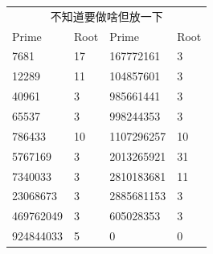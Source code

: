
\begin{tabular}{ l l l l }
    \multicolumn{4}{c}{不知道要做啥但放一下}\\
    Prime & Root & Prime & Root \\
    7681  &   17 & 167772161 & 3 \\
    12289 & 11  &104857601 & 3 \\
    40961 & 3 & 985661441 & 3 \\
    65537 & 3 & 998244353 & 3 \\   
    786433 & 10 & 1107296257 & 10 \\
    5767169 & 3 & 2013265921 & 31 \\
    7340033 & 3 & 2810183681 & 11 \\
    23068673 & 3 & 2885681153 & 3 \\
    469762049 & 3 & 605028353 & 3 \\
    924844033 & 5 & 0 & 0
\end{tabular}